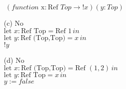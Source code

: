 \documentclass{article}
\newcommand{\step}[2]{{\tt #1} $\longrightarrow$ {\tt #2}}
\newcommand{\inferrule}[3]{\infrule[#1]{\mbox{#2}}{\mbox{#3}}}
\newcommand{\inferax}[2]{\infrule[#1]{\mbox{}}{\mbox{#2}}}
\begin{document}
\begin{description}
\begin{enumerate}
                $\ (function \text{ x}: \text{Ref }Top \rightarrow !x)(y:Top)$
                \item[(c)] {No}\\
                $\text{let } x: \text{Ref Top} = \text{Ref } 1 \, in $\\
                $\text{let } y: \text{Ref (Top,Top)} = x\, in$\\
                $!y$
                \item[(d)] {No}\\
                $\text{let } x: \text{Ref (Top,Top)} = \text{Ref } (1,2) \, in $\\
                $\text{let } y: \text{Ref Top} = x \,in$\\
                $y:=false$
            \end{enumerate}
    \end{description}

%
%
%
%
%
%
%
%
%
%
%
%
%
%
%
%
%
%
%
\end{document}
